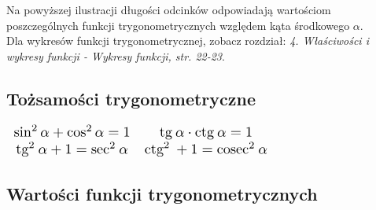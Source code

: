 \documentclass[14pt,a4paper]{extarticle}
\newcommand{\scalemath}[2][4]{\scalebox{#1}{\ensuremath{#2}}}
\begin{document}
\noindent Na powyższej ilustracji długości odcinków odpowiadają wartościom poszczególnych
funkcji trygonometrycznych względem kąta środkowego $\alpha$.\\

\noindent Dla wykresów funkcji trygonometrycznej, zobacz rozdział: \textit{4. Właściwości i wykresy funkcji - Wykresy funkcji, str. 22-23}.
\subsection{Tożsamości trygonometryczne}

\begin{center}
{%
\renewcommand{\arraystretch}{2}
\renewcommand{\arraycolsep}{0.5cm}

\(
   \scalemath[1.3]{%
   \begin{array}{cc}
      \sin^{2} \alpha + \cos^{2} \alpha = 1 & \text{tg}\: \alpha \cdot \text{ctg}\: \alpha = 1\\
      \text{tg}^{2}\: \alpha + 1 = \text{sec}^{2}\: \alpha & \text{ctg}^{2}\: + 1 = \text{cosec}^{2}\: \alpha   
   \end{array}
   }%
\)

}%
\end{center}

\newpage

\subsection{Wartości funkcji trygonometrycznych}
\end{document}
